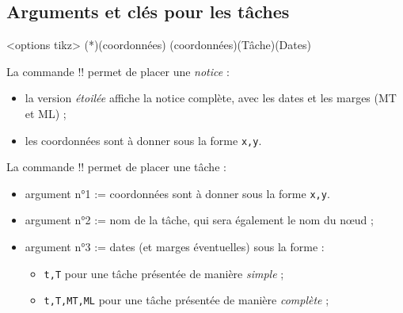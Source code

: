 \documentclass[french,a4paper,11pt]{article}
\begin{document}
\begin{DemoCode}[]
\begin{GrapheMPM}[Grille={14,5}]
\end{GrapheMPM}
\end{DemoCode}

\pagebreak

\subsection{Arguments et clés pour les tâches}

\begin{DemoCode}
\begin{GrapheMPM}[clés]<options tikz>
	\MPMPlaceNotice(*)(coordonnées)
	\MPMPlaceTache(coordonnées)(Tâche)(Dates)
\end{GrapheMPM}
\end{DemoCode}

\begin{tipblock}
La commande \motcletex!\MPMPlaceNotice! permet de placer une \textit{notice} :

\begin{itemize}
	\item la version \textit{étoilée} affiche la notice complète, avec les dates et les marges (MT et ML) ;
	\item les coordonnées sont à donner sous la forme \verb!x,y!.
\end{itemize}
\vspace*{-\baselineskip}\leavevmode
\end{tipblock}

\begin{tipblock}
La commande \motcletex!\MPMPlaceTache! permet de placer une tâche :

\begin{itemize}
	\item argument n°1 := coordonnées sont à donner sous la forme \verb!x,y!.
	\item argument n°2 := nom de la tâche, qui sera également le nom du nœud ;
	\item argument n°3 := dates (et marges éventuelles) sous la forme :
	\begin{itemize}
		\item \verb!t,T! pour une tâche présentée de manière \textit{simple} ;
		\item \verb!t,T,MT,ML! pour une tâche présentée de manière \textit{complète} ;
	\end{itemize}
\end{itemize}
\vspace*{-\baselineskip}\leavevmode
\end{tipblock}
\end{document}
